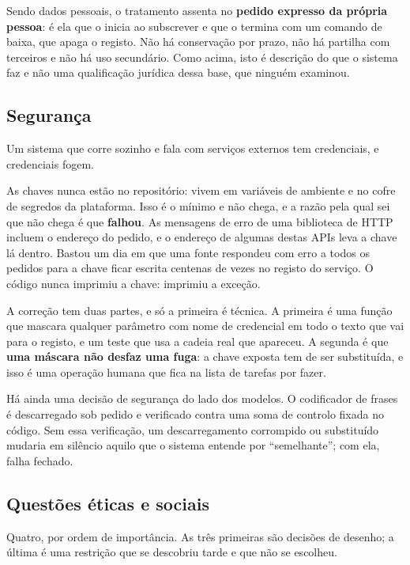 Sendo dados pessoais, o tratamento assenta no \textbf{pedido expresso da própria pessoa}: é ela
que o inicia ao subscrever e que o termina com um comando de baixa, que apaga o registo. Não há
conservação por prazo, não há partilha com terceiros e não há uso secundário. Como acima, isto é
descrição do que o sistema faz e não uma qualificação jurídica dessa base, que ninguém examinou.

\subsection{Segurança}
\label{sec:met_seguranca}

Um sistema que corre sozinho e fala com serviços externos tem credenciais, e credenciais fogem.

As chaves nunca estão no repositório: vivem em variáveis de ambiente e no cofre de segredos da
plataforma. Isso é o mínimo e não chega, e a razão pela qual sei que não chega é que \textbf{falhou}.
As mensagens de erro de uma biblioteca de HTTP incluem o endereço do pedido, e o endereço de
algumas destas \glspl{API} leva a chave lá dentro. Bastou um dia em que uma fonte respondeu com
erro a todos os pedidos para a chave ficar escrita centenas de vezes no registo do serviço. O
código nunca imprimiu a chave: imprimiu a exceção.

A correção tem duas partes, e só a primeira é técnica. A primeira é uma função que mascara
qualquer parâmetro com nome de credencial em todo o texto que vai para o registo, e um teste que
usa a cadeia real que apareceu. A segunda é que \textbf{uma máscara não desfaz uma fuga}: a chave
exposta tem de ser substituída, e isso é uma operação humana que fica na lista de tarefas por
fazer.

Há ainda uma decisão de segurança do lado dos modelos. O codificador de frases é descarregado sob
pedido e verificado contra uma soma de controlo fixada no código. Sem essa verificação, um
descarregamento corrompido ou substituído mudaria em silêncio aquilo que o sistema entende por
``semelhante''; com ela, falha fechado.

\subsection{Questões éticas e sociais}
\label{sec:met_etica}

Quatro, por ordem de importância. As três primeiras são decisões de desenho; a última é uma
restrição que se descobriu tarde e que não se escolheu.

